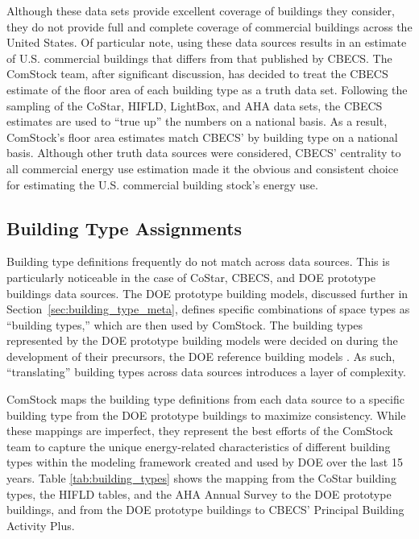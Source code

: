 Although these data sets provide excellent coverage of buildings they consider, they do not provide full and complete coverage of commercial buildings across the United States. Of particular note, using these data sources results in an estimate of U.S. commercial buildings that differs from that published by CBECS. The ComStock team, after significant discussion, has decided to treat the CBECS estimate of the floor area of each building type as a truth data set. Following the sampling of the CoStar, HIFLD, LightBox, and AHA data sets, the CBECS estimates are used to ``true up'' the numbers on a national basis. As a result, ComStock's floor area estimates match CBECS' by building type on a national basis. Although other truth data sources were considered, CBECS' centrality to all commercial energy use estimation made it the obvious and consistent choice for estimating the U.S. commercial building stock's energy use.

\subsection{Building Type Assignments} \label{sec:btype_assignments}

Building type definitions frequently do not match across data sources. This is particularly noticeable in the case of CoStar, CBECS, and DOE prototype buildings data sources. The DOE prototype building models, discussed further in Section~\ref{sec:building_type_meta}, defines specific combinations of space types as ``building types,'' which are then used by ComStock. The building types represented by the DOE prototype building models were decided on during the development of their precursors, the DOE reference building models \citep{doe_reference_buildings}. As such, ``translating'' building types across data sources introduces a layer of complexity.

ComStock maps the building type definitions from each data source to a specific building type from the DOE prototype buildings to maximize consistency. While these mappings are imperfect, they represent the best efforts of the ComStock team to capture the unique energy-related characteristics of different building types within the modeling framework created and used by DOE over the last 15 years. Table \ref{tab:building_types} shows the mapping from the CoStar building types, the HIFLD tables, and the AHA Annual Survey to the DOE prototype buildings, and from the DOE prototype buildings to CBECS' Principal Building Activity Plus.

